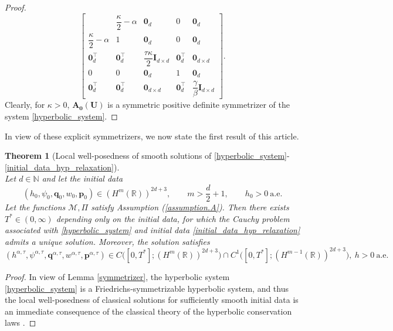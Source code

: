 \documentclass[11pt]{article}
\numberwithin{equation}{section}
\newtheorem{theorem} {Theorem}[section]
\newtheorem{counter example}[theorem]{Counter Example}
\numberwithin{equation}{section}
\numberwithin{equation}{section}
\begin{document}
\begin{proof}
\[\begin{bmatrix}
&
\dfrac{\kappa}{2}-\alpha
&
\mathbf 0_d&0&\mathbf 0_d
\\[0.8em]
\dfrac{\kappa}{2}-\alpha
&
1
&
\mathbf 0_d&0&\mathbf 0_d
\\[0.8em]
\mathbf 0_d^\top&\mathbf 0_d^\top&
\dfrac{\tau\kappa}{2}\mathbf I_{d\times d}
&
\mathbf 0_d^\top&\mathbf 0_{d\times d}
\\[0.8em]
0&0&\mathbf 0_d&1&\mathbf 0_d
\\[0.3em]
\mathbf 0_d^\top&\mathbf 0_d^\top&
\mathbf 0_{d\times d}&
\mathbf 0_d^\top&
\dfrac{\gamma}{\beta}\mathbf I_{d\times d}
\end{bmatrix}.
\]
Clearly, for $\kappa>0$, $\mathbf{A_0(U)}$ is a symmetric positive definite symmetrizer of the system \eqref{hyperbolic_system}.
\end{proof}
In view of these explicit symmetrizers, we now state the first result of this article.
\begin{theorem}[Local well-posedness of smooth solutions of \eqref{hyperbolic_system}-\eqref{initial_data_hyp_relaxation}]
\label{local_wellposedness}
\leavevmode\\
Let $d\in\mathbb{N}$ and let the initial data
\[
(h_0,\psi_0,\mathbf{q}_0,w_0,\mathbf{p}_0)\in (H^m(\mathbb{R}))^{2d+3},\qquad 
m>\frac{d}{2}+1,\qquad h_0>0 \ \text{a.e.}
\]
Let the functions
$\mathcal{M},\Pi$ satisfy Assumption (\ref{assumption.A}). Then there exists $T^*\in(0,\infty)$ depending only on the initial data, for which the Cauchy problem 
associated with \eqref{hyperbolic_system} and initial data \eqref{initial_data_hyp_relaxation} admits a unique solution. Moreover, the 
solution satisfies
\[
(h^{\alpha, \tau}, \psi^{\alpha, \tau},\mathbf{q}^{\alpha, \tau}, w^{\alpha, \tau}, \mathbf{p}^{\alpha, \tau}) \in C\!\big([0,T^*];(H^m(\mathbb{R}))^{2d+3}\big)
\cap C^1\!\big([0,T^*];(H^{m-1}(\mathbb{R}))^{2d+3}\big),~h>0~\text{a.e.}
\]
\end{theorem}
\begin{proof}
In view of Lemma \ref{symmetrizer}, the hyperbolic system \eqref{hyperbolic_system}  is a Friedrichs-symmetrizable hyperbolic system, and thus the local well-posedness of classical solutions for sufficiently smooth initial data is an immediate consequence of the classical theory of the hyperbolic conservation laws \cite{dafermos2005hyperbolic}.   
\end{proof}
\end{document}
